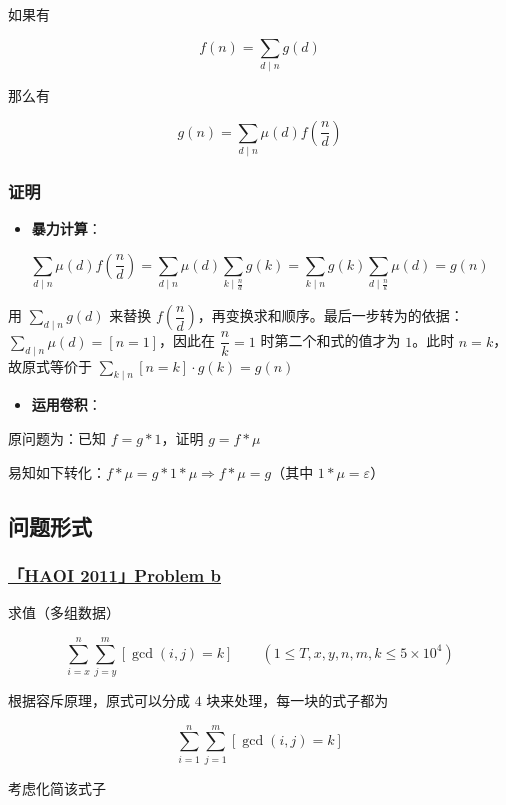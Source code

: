 如果有

$$
f(n)=\sum_{d\mid n}g(d)
$$

那么有

$$
g(n)=\sum_{d\mid n}\mu(d)f(\frac{n}{d})
$$

\subsubsection{证明}

\begin{itemize}
\item \textbf{暴力计算}：
\end{itemize}

$$
\sum_{d\mid n}\mu(d)f(\frac{n}{d})=\sum_{d\mid n}\mu(d)\sum_{k\mid \frac{n}{d}}g(k)=\sum_{k\mid n}g(k)\sum_{d\mid \frac{n}{k}}\mu(d)=g(n)
$$

用 $\displaystyle\sum_{d\mid n}g(d)$ 来替换 $f(\dfrac{n}{d})$，再变换求和顺序。最后一步转为的依据：$\displaystyle\sum_{d\mid n}\mu(d)=[n=1]$，因此在 $\dfrac{n}{k}=1$ 时第二个和式的值才为 $1$。此时 $n=k$，故原式等价于 $\displaystyle\sum_{k\mid n}[n=k]\cdot g(k)=g(n)$

\begin{itemize}
\item \textbf{运用卷积}：
\end{itemize}

原问题为：已知 $f=g*1$，证明 $g=f*\mu$

易知如下转化：$f*\mu=g*1*\mu\Rightarrow f*\mu=g$（其中 $1*\mu=\varepsilon$）

\hr

\subsection{问题形式}

\subsubsection{\href{https://www.lydsy.com/JudgeOnline/problem.php?id=2301}{「HAOI 2011」Problem b}}

求值（多组数据）

$$
\sum_{i=x}^{n}\sum_{j=y}^{m}[\gcd(i,j)=k]\qquad (1\leqslant T,x,y,n,m,k\leqslant 5\times 10^4)
$$

根据容斥原理，原式可以分成 $4$ 块来处理，每一块的式子都为

$$
\sum_{i=1}^{n}\sum_{j=1}^{m}[\gcd(i,j)=k]
$$

考虑化简该式子

